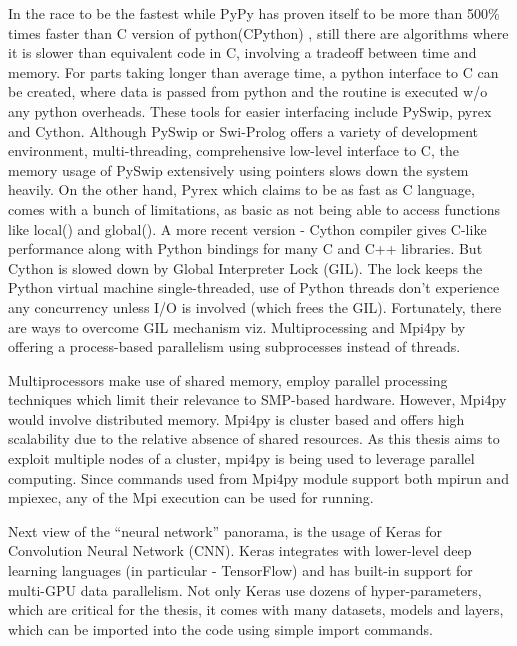 In the race to be the fastest while PyPy has proven itself to be more than 500\% times faster than C version of python(CPython) \cite{pypy}, still there are algorithms where it is slower than equivalent code in C, involving a tradeoff between time and memory. For parts taking longer than average time, a python interface to C can be created, where data is passed from python and the routine is executed w/o any python overheads. These tools for easier interfacing include PySwip, pyrex and Cython. Although PySwip or Swi-Prolog offers a variety of development environment, multi-threading, comprehensive low-level interface to C, the memory usage of PySwip extensively using pointers slows down the system heavily. On the other hand, Pyrex which claims to be as fast as C language\cite{pyrexDocumentation}, comes with a bunch of limitations, as basic as not being able to access functions like local() and global()\cite{pyrexLimitations}. A more recent version - Cython compiler gives C-like performance along with Python bindings for many C and C++ libraries. But Cython is slowed down by Global Interpreter Lock (GIL). The lock keeps the Python virtual machine single-threaded, use of Python threads don't experience any concurrency unless I/O is involved (which frees the GIL). Fortunately, there are ways to overcome GIL mechanism viz. Multiprocessing and Mpi4py by offering a process-based parallelism using subprocesses instead of threads\cite{pythonDocumentation}.

 
Multiprocessors make use of shared memory, employ parallel processing techniques which limit their relevance to SMP-based hardware. However, Mpi4py would involve distributed memory. Mpi4py is cluster based and offers high scalability due to the relative absence of shared resources\cite{dalcin2008mpi}. As this thesis aims to exploit multiple nodes of a cluster, mpi4py is being used to leverage parallel computing. Since commands used from Mpi4py module support both mpirun and mpiexec, any of the Mpi execution can be used for running.


Next view of the “neural network” panorama, is the usage of Keras for Convolution Neural Network (CNN). Keras integrates with lower-level deep learning languages (in particular - TensorFlow) and has built-in support for multi-GPU data parallelism. Not only Keras use dozens of hyper-parameters, which are critical for the thesis, it comes with many datasets, models and layers, which can be imported into the code using simple import commands\cite{chollet2015keras}.


